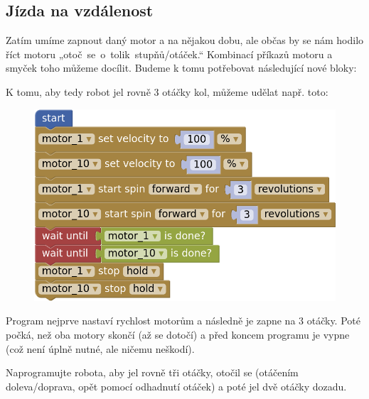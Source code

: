 \documentclass[../main.tex]{subfiles}
\begin{document}
	\subsection{Jízda na vzdálenost}\label{cha:distanceride}
	Zatím umíme zapnout daný motor a na nějakou dobu, ale občas by se nám hodilo říct motoru „otoč~se~o~tolik~stupňů/otáček.“ Kombinací příkazů motoru a smyček toho můžeme docílit. Budeme k tomu potřebovat následující nové bloky:
	\begin{itemize}
		\blockMotorDistance
		\blockMotorVelocity
		\blockWaitUntil
		\blockMotorDone
	\end{itemize}

	K tomu, aby tedy robot jel rovně 3 otáčky kol, můžeme udělat např. toto:

	\begin{figure}
		\centering
		\begin{minipage}{0.5\textwidth}
			\includegraphics[width=\linewidth]{Images/02/sol.png}
		\end{minipage}
	\end{figure}

	Program nejprve nastaví rychlost motorům a následně je zapne na $3$ otáčky. Poté počká, než oba motory skončí (až se dotočí) a před koncem programu je vypne (což není úplně nutné, ale ničemu neškodí).

	\begin{question}
		Naprogramujte robota, aby jel rovně tři otáčky, otočil se (otáčením doleva/doprava, opět pomocí odhadnutí otáček) a poté jel dvě otáčky dozadu.
	\end{question}
\end{document}
